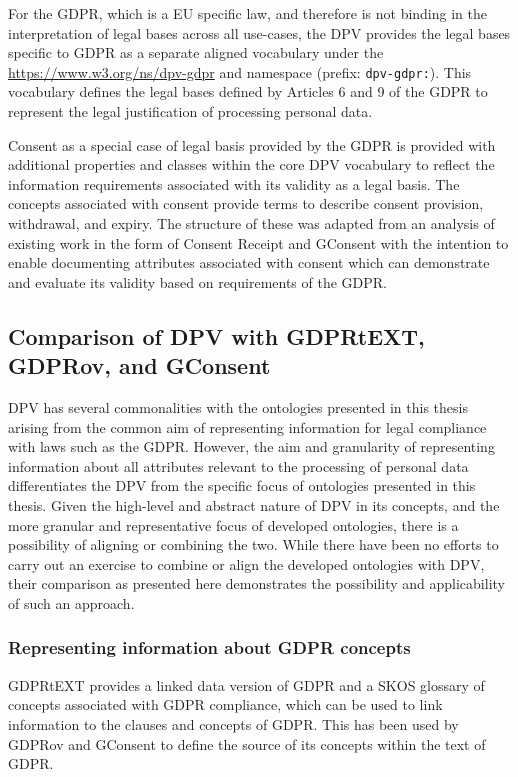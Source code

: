 For the GDPR, which is a EU specific law, and therefore is not binding in the interpretation of legal bases across all use-cases, the DPV provides the legal bases specific to GDPR as a separate aligned vocabulary under the \url{https://www.w3.org/ns/dpv-gdpr} and namespace (prefix: \texttt{dpv-gdpr:}). 
This vocabulary defines the legal bases defined by Articles 6 and 9 of the GDPR to represent the legal justification of processing personal data.

Consent as a special case of legal basis provided by the GDPR is provided with additional properties and classes within the core DPV vocabulary to reflect the information requirements associated with its validity as a legal basis.
The concepts associated with consent provide terms to describe consent provision, withdrawal, and expiry.
The structure of these was adapted from an analysis of existing work in the form of Consent Receipt \cite{lizar_consent_2017} and GConsent \cite{pandit_gconsent_2019} with the intention to enable documenting attributes associated with consent which can demonstrate and evaluate its validity based on requirements of the GDPR.

\subsection{Comparison of DPV with GDPRtEXT, GDPRov, and GConsent}
DPV has several commonalities with the ontologies presented in this thesis arising from the common aim of representing information for legal compliance with laws such as the GDPR.
However, the aim and granularity of representing information about all attributes relevant to the processing of personal data differentiates the DPV from the specific focus of ontologies presented in this thesis.
Given the high-level and abstract nature of DPV in its concepts, and the more granular and representative focus of developed ontologies, there is a possibility of aligning or combining the two.
While there have been no efforts to carry out an exercise to combine or align the developed ontologies with DPV, their comparison as presented here demonstrates the possibility and applicability of such an approach.

\subsubsection{Representing information about GDPR concepts}
GDPRtEXT provides a linked data version of GDPR and a SKOS glossary of concepts associated with GDPR compliance, which can be used to link information to the clauses and concepts of GDPR.
This has been used by GDPRov and GConsent to define the source of its concepts within the text of GDPR.

